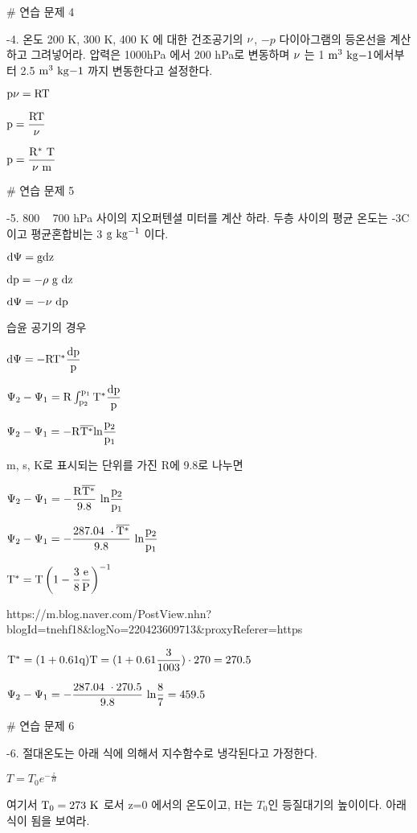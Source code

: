 # 연습 문제 4


-4. 온도 200 K, 300 K, 400 K 에 대한 건조공기의 $ \rm \nu $, $ - p$ 다이아그램의 등온선을 계산하고 그려넣어라. 압력은 1000hPa 에서 200 hPa로 변동하며  $ \rm \nu $ 는 1 $\rm m^{3}~ kg{-1}$에서부터 2.5 $\rm m^{3}~ kg{-1}$ 까지 변동한다고 설정한다.

$ \rm p  \nu = R T $

$ \rm p = \dfrac{R T}{ \nu} $

$ \rm p = \dfrac{R^{*} ~T}{ \nu~ m} $



# 연습 문제 5


-5. 800 ~ 700 hPa 사이의 지오퍼텐셜 미터를 계산 하라. 두층 사이의 평균 온도는 -3C 이고 평균혼합비는 3 $ \rm g~kg^{-1}$ 이다.


$ \rm d \Psi  = g dz $

$ \rm dp = - \rho~g~dz $

$ \rm d \Psi  = - \nu~ dp $

습윤 공기의 경우

$ \rm d \Psi  = - R T^{*} \dfrac{dp}{p} $

$ \rm \Psi_2 - \Psi_1  =  R \int_{p_2}^{p_1} T^{*} \dfrac{dp}{p} $

$ \rm \Psi_2 - \Psi_1  =  -R \overline{ T^{*}} ln \dfrac{p_2}{p_1} $

m, s, K로 표시되는 단위를 가진 R에 9.8로 나누면

$ \rm \Psi_2 - \Psi_1  =  - \dfrac {R \overline{ T^{*}}}{9.8} ~ ln \dfrac{p_2}{p_1} $

$ \rm \Psi_2 - \Psi_1  =  - \dfrac {287.04 ~\cdot\overline{ T^{*}}}{9.8} ~ ln \dfrac{p_2}{p_1} $


$\rm T^{*} = T \left( 1- \dfrac{3}{8} \dfrac{e}{P} \right)^{-1}$


https://m.blog.naver.com/PostView.nhn?blogId=tnehf18&logNo=220423609713&proxyReferer=https%

$\rm T^{*} = (1 + 0.61 q) T = (1 + 0.61 \dfrac{3}{1003}) \cdot 270 = 270.5$

$ \rm \Psi_2 - \Psi_1  =  - \dfrac {287.04 ~\cdot{ 270.5}}{9.8} ~ ln \dfrac{8}{7}  = 459.5$




# 연습 문제 6


-6. 절대온도는 아래 식에 의해서 지수함수로 냉각된다고 가정한다.

$ T = T_{0} e^{-\frac{z}{H}}$

여기서 $\rm T_{0} = 273~K$ 로서 z=0 에서의 온도이고, H는 $ T_{0}$인 등질대기의 높이이다. 아래 식이 됨을 보여라.

